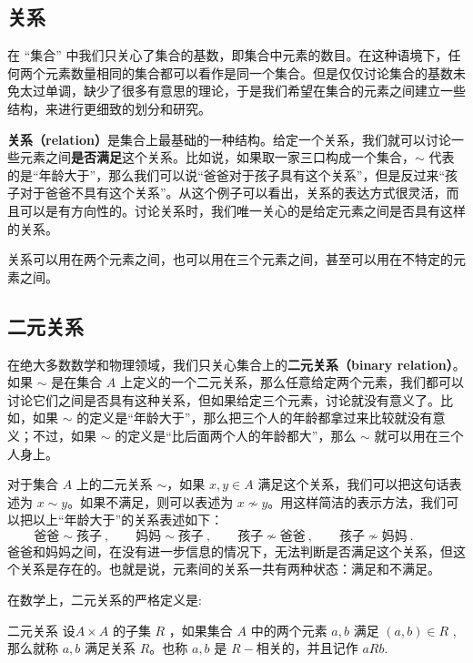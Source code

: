 

\subsection{关系}

在 “集合” 中我们只关心了集合的基数，即集合中元素的数目。在这种语境下，任何两个元素数量相同的集合都可以看作是同一个集合。但是仅仅讨论集合的基数未免太过单调，缺少了很多有意思的理论，于是我们希望在集合的元素之间建立一些结构，来进行更细致的划分和研究。

\textbf{关系（relation）}是集合上最基础的一种结构。给定一个关系，我们就可以讨论一些元素之间\textbf{是否满足}这个关系。比如说，如果取一家三口构成一个集合，$\sim$ 代表的是“年龄大于”，那么我们可以说“爸爸对于孩子具有这个关系”，但是反过来“孩子对于爸爸不具有这个关系”。从这个例子可以看出，关系的表达方式很灵活，而且可以是有方向性的。讨论关系时，我们唯一关心的是给定元素之间是否具有这样的关系。

关系可以用在两个元素之间，也可以用在三个元素之间，甚至可以用在不特定的元素之间。

\subsection{二元关系}\label{sub_Relat_3}

在绝大多数数学和物理领域，我们只关心集合上的\textbf{二元关系（binary relation）}。如果 $\sim$ 是在集合 $A$ 上定义的一个二元关系，那么任意给定两个元素，我们都可以讨论它们之间是否具有这种关系，但如果给定三个元素，讨论就没有意义了。比如，如果 $\sim$ 的定义是“年龄大于”，那么把三个人的年龄都拿过来比较就没有意义；不过，如果 $\sim$ 的定义是“比后面两个人的年龄都大”，那么 $\sim$ 就可以用在三个人身上。

对于集合 $A$ 上的二元关系 $\sim$，如果 $x, y\in A$ 满足这个关系，我们可以把这句话表述为 $x\sim y$。如果不满足，则可以表述为 $x\not\sim y$。用这样简洁的表示方法，我们可以把以上“年龄大于”的关系表述如下：
\begin{equation}
\text{爸爸}\sim\text{孩子}~, \qquad
\text{妈妈}\sim\text{孩子}~, \qquad
\text{孩子}\not\sim\text{爸爸}~, \qquad
\text{孩子}\not\sim\text{妈妈}~. \qquad
\end{equation}
爸爸和妈妈之间，在没有进一步信息的情况下，无法判断是否满足这个关系，但这个关系是存在的。也就是说，元素间的关系一共有两种状态：满足和不满足。

在数学上，二元关系的严格定义是:
\begin{definition}{二元关系}
设$A \times A$ 的子集 $R$ ，如果集合 $A$ 中的两个元素 $a,b$ 满足 $(a,b) \in R$ ,那么就称 $a,b$ 满足关系 $R$。也称 $a,b$ 是 $R-$相关的，并且记作 $aRb$.
\end{definition}

